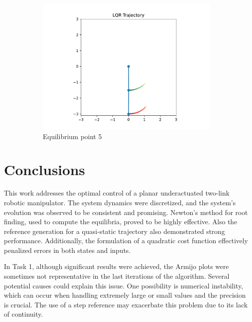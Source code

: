 \begin{figure}[htb]
    \begin{subfigure}[b]{0.7\textwidth}
        \centering
        \includegraphics[width=\linewidth]{img/Animation/Eq5.pdf}
        \caption{Equilibrium point 5}
        \label{fig:eq5}
    \end{subfigure}
    \caption{}
    \label{fig:equilibrium-set2}
\end{figure}



\chapter*{Conclusions}

This work addresses the optimal control of a planar underactuated two-link robotic manipulator. The system dynamics were discretized, and the system's evolution was observed to be consistent and promising. Newton's method for root finding, used to compute the equilibria, proved to be highly effective. Also the reference generation for a quasi-static trajectory also demonstrated strong performance. Additionally, the formulation of a quadratic cost function effectively penalized errors in both states and inputs.

In Task 1, although significant results were achieved, the Armijo plots were sometimes not representative in the last iterations of the algorithm. Several potential causes could explain this issue. One possibility is numerical instability, which can occur when handling extremely large or small values and the precision is crucial. The use of a step reference may exacerbate this problem due to its lack of continuity.


